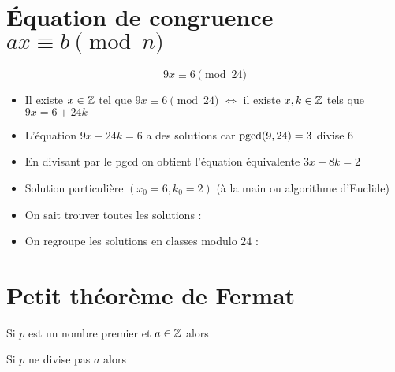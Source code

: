 \section{\'Equation de congruence $ax \equiv b \pmod n$}

\begin{frame}
  
\pause
\vspace*{-1ex}
\begin{exemple}
\vspace*{-1ex}
$$9x \equiv 6 \pmod{24}$$
\pause
\vspace*{-4ex}
{\small
\begin{itemize}[<+->]
  \item Il existe $x\in \mathbb{Z}$ tel que $9x \equiv 6 \pmod{24}$ $\iff$ il existe $x,k \in \mathbb{Z}$ tels que $9x = 6 + 24k$
  \item L'équation $9x-24k=6$ a des solutions car $\mathop{\text{pgcd}}\nolimits(9,24)=3$ divise $6$
  \item En divisant par le pgcd on obtient l'équation équivalente $3x-8k=2$
  \item Solution particulière $(x_0=6,k_0=2)$ (à la main ou algorithme d'Euclide)
  \item On sait trouver toutes les solutions : 
  \item On regroupe les solutions en classes modulo $24$ :
\vspace*{-1ex}
\end{itemize}
}

\end{exemple}
\end{frame}


\section{Petit théorème de Fermat}


\begin{frame}
  


\begin{theoreme}
Si $p$ est un nombre premier et $a \in \mathbb{Z}$ alors
\end{theoreme}

\pause
\bigskip
\bigskip

\begin{corollaire}
Si $p$ ne divise pas $a$ alors
\end{corollaire}
\end{frame}


